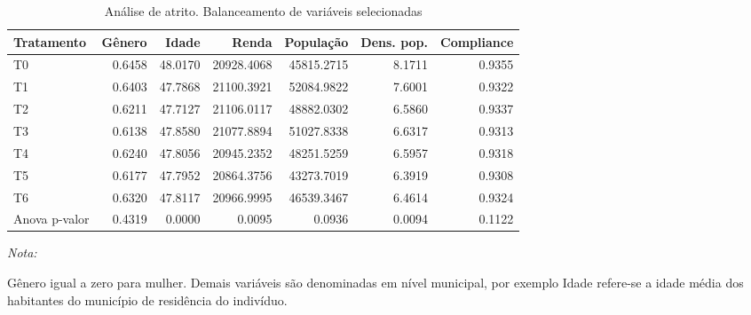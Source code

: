 \begin{table}[H]

\caption{\label{tab:atrito}Análise de atrito. Balanceamento de variáveis selecionadas}
\centering
\begin{threeparttable}
\begin{tabular}[t]{lrrrrrr}
\toprule
Tratamento & Gênero & Idade & Renda & População & Dens. pop. & Compliance\\
\midrule
T0 & 0.6458 & 48.0170 & 20928.4068 & 45815.2715 & 8.1711 & 0.9355\\
T1 & 0.6403 & 47.7868 & 21100.3921 & 52084.9822 & 7.6001 & 0.9322\\
T2 & 0.6211 & 47.7127 & 21106.0117 & 48882.0302 & 6.5860 & 0.9337\\
T3 & 0.6138 & 47.8580 & 21077.8894 & 51027.8338 & 6.6317 & 0.9313\\
T4 & 0.6240 & 47.8056 & 20945.2352 & 48251.5259 & 6.5957 & 0.9318\\
\addlinespace
T5 & 0.6177 & 47.7952 & 20864.3756 & 43273.7019 & 6.3919 & 0.9308\\
T6 & 0.6320 & 47.8117 & 20966.9995 & 46539.3467 & 6.4614 & 0.9324\\
Anova p-valor & 0.4319 & 0.0000 & 0.0095 & 0.0936 & 0.0094 & 0.1122\\
\bottomrule
\end{tabular}
\begin{tablenotes}
\item \textit{Nota:} 
\item Gênero igual a zero para mulher. Demais variáveis são denominadas em nível municipal, por exemplo Idade refere-se a idade média dos habitantes do município de residência do indivíduo.
\end{tablenotes}
\end{threeparttable}
\end{table}
